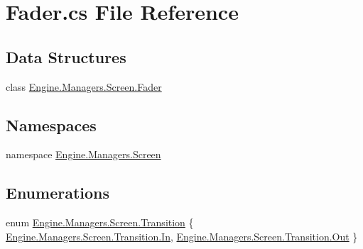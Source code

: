 \hypertarget{a00182}{}\section{Fader.\+cs File Reference}
\label{a00182}
\subsection*{Data Structures}
\begin{DoxyCompactItemize}
\item 
class \hyperlink{a00534}{Engine.\+Managers.\+Screen.\+Fader}
\end{DoxyCompactItemize}
\subsection*{Namespaces}
\begin{DoxyCompactItemize}
\item 
namespace \hyperlink{a00273}{Engine.\+Managers.\+Screen}
\end{DoxyCompactItemize}
\subsection*{Enumerations}
\begin{DoxyCompactItemize}
\item 
enum \hyperlink{a00273_a5ba0395c15683984f73feffe79799042}{Engine.\+Managers.\+Screen.\+Transition} \{ \hyperlink{a00273_a5ba0395c15683984f73feffe79799042aefeb369cccbd560588a756610865664c}{Engine.\+Managers.\+Screen.\+Transition.\+In}, 
\hyperlink{a00273_a5ba0395c15683984f73feffe79799042a7c147cda9e49590f6abe83d118b7353b}{Engine.\+Managers.\+Screen.\+Transition.\+Out}
 \}
\end{DoxyCompactItemize}
